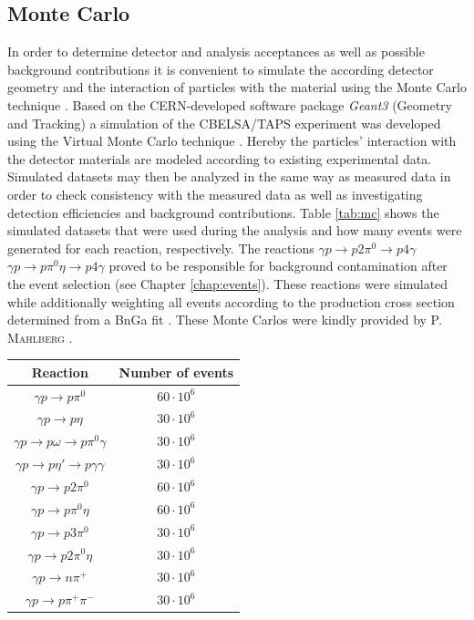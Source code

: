 \subsection{Monte Carlo}
In order to determine detector and analysis acceptances as well as possible background contributions it is convenient to simulate the according detector geometry and the interaction of particles with the material using the Monte Carlo technique \cite{mc}. Based on the CERN-developed software package \emph{Geant3} (Geometry and Tracking) \cite{g3} a simulation of the CBELSA/TAPS experiment was developed using the Virtual Monte Carlo technique \cite{kalisch}. Hereby the particles' interaction with the detector materials are modeled according to existing experimental data. Simulated datasets may then be analyzed in the same way as measured data in order to check consistency with the measured data as well as investigating detection efficiencies and background contributions. Table \ref{tab:mc} shows the simulated datasets that were used during the analysis and how many events were generated for each reaction, respectively. The reactions $\gamma p\to p2\pi^0\to p4\gamma$ $\gamma p\to p\pi^0\eta\to p4\gamma$ proved to be responsible for background contamination after the event selection (see Chapter \ref{chap:events}). These reactions were simulated while additionally weighting all events according to the production cross section determined from a BnGa fit \cite{bnga1,bnga2}.  These Monte Carlos were kindly provided by \textsc{P. Mahlberg} \cite{mahlbergphd}.
\begin{table}[htbp]
	\centering
	\begin{tabular}{cc}
		\toprule
		Reaction & Number of events\\
		\hline
		$\gamma p \to p\pi^0$ & $60\cdot10^6$\\
		$\gamma p \to p\eta$ & $30\cdot10^6$\\
		$\gamma p \to p\omega\to p\pi^0\gamma$ & $30\cdot10^6$\\
		$\gamma p \to p\eta'\to p\gamma\gamma$ & $30\cdot10^6$\\
		$\gamma p \to p2\pi^0$ & $60\cdot10^6$\\
		$\gamma p \to p\pi^0\eta$ & $60\cdot10^6$\\
		$\gamma p \to p3\pi^0$ & $30\cdot10^6$\\
		$\gamma p \to p2\pi^0\eta$ & $30\cdot10^6$\\
		$\gamma p \to n\pi^+$ & $30\cdot10^6$\\
		$\gamma p \to p\pi^+\pi^-$ & $30\cdot10^6$\\
		\bottomrule
	\end{tabular}
\end{table}
